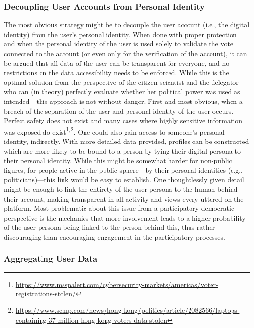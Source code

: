 \subsubsection{Decoupling User Accounts from Personal Identity}

The most obvious strategy might be to decouple the user account (i.e., the digital identity) from the user’s personal identity. When done with proper protection and when the personal identity of the user is used solely to validate the vote connected to the account (or even only for the verification of the account), it can be argued that all data of the user can be transparent for everyone, and no restrictions on the data accessibility needs to be enforced. While this is the optimal solution from the perspective of the citizen scientist and the delegator---who can (in theory) perfectly evaluate whether her political power was used as intended---this approach is not without danger. First and most obvious, when a breach of the separation of the user and personal identity of the user occurs. Perfect safety does not exist and many cases where highly sensitive information was exposed do exist\footnote{\url{https://www.msspalert.com/cybersecurity-markets/americas/voter-registrations-stolen/}}\textsuperscript{,}\footnote{\url{https://www.scmp.com/news/hong-kong/politics/article/2082566/laptops-containing-37-million-hong-kong-voters-data-stolen}}. One could also gain access to someone’s personal identity, indirectly. With more detailed data provided, profiles can be constructed which are more likely to be bound to a person by tying their digital persona to their personal identity. While this might be somewhat harder for non-public figures, for people active in the public sphere---by their personal identities (e.g., politicians)---this link would be easy to establish. One thoughtlessly given detail might be enough to link the entirety of the user persona to the human behind their account, making transparent in all activity and views every uttered on the platform. 
Most problematic about this issue from a participatory democratic perspective is the mechanics that more involvement leads to a higher probability of the user persona being linked to the person behind this, thus rather discouraging than encouraging engagement in the participatory processes.

\subsubsection{Aggregating User Data}

